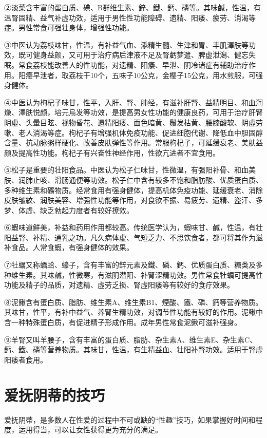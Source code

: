 \documentclass[12pt,UTF8]{ctexbook}
\begin{document}
②淡菜含丰富的蛋白质、碘、B群维生素、鋅、鐵、鈣、磷等。其味鹹，性温，有温腎固精、益气补虚功效，适用于男性性功能障碍、遗精、阳痿、疲劳、消渴等症。男性常食可强壮身体，增强性功能。

③中医认为荔枝味甘，性温，有补益气血、添精生髓、生津和胃、丰肌澤肤等功效，既可健身益颜，又可用于治疗病后津液不足及腎虧梦遣、脾虚泄潟、健忘失眠。常食荔枝能改善人的性功能，对遗精、阳痿、早泄、阴冷诸症有辅助治疗作用。阳痿早泄者，取荔枝干10个，五味子10公克，金樱子15公克，用水煎服，可强身健体。

④中医认为枸杞子味甘，性平，入肝、腎、肺经，有滋补肝腎、益精明目、和血润燥、澤肤悦颜，培元烏发等功效，是提高男女性功能的健康良药，可用于治疗肝腎阴虛、头暈目眩、视物昏花、遗精阳痿、面色暗黄、鬚发枯黄、腰膝酸软、阴虛劳嗽、老人消渴等症。枸杞子有增强机体免疫功能、促进细胞代谢、降低血中胆固醇含量、抗动脉粥样硬化、改善皮肤弹性等作用。常服枸杞子，可延缓衰老、美肤益颜及提高性功能。枸杞子有兴奋性神经作用，性欲亢进者不宜食用。

⑤松子是重要的壮阳食品。中医认为松子仁味甘，性微温，有强阳补骨、和血美肤、润肺止咳、滑肠通便等功效。松子仁中含有较多不饱和脂肪酸、优质蛋白质、多种维生素和礦物质。经常食用有强身健体，提高机体免疫功能、延缓衰老、消除皮肤皱紋、润肤美容、增强性功能等作用，对食欲不振、易疲劳、遗精、盗汗、多梦、体虚、缺乏勃起力度者有较好撩效。

⑥蝦味道鮮美，补益和药用作用都较高。传统医学认为，蝦味甘、鹹，性温，有壮阳益腎、补精、通乳之功。凡久病体虚、气短乏力、不思饮食者，都可将其作为滋补食品。人常食蝦，有强身健体的效果。

⑦牡蠣又称蠣蛤、蠔子，含有丰富的鋅元素及鐵、磷、鈣、优质蛋白质、糖类及多种维生素。其味鹹，性微寒，有滋阴潜阳、补腎涩精功效。男性常食牡蠣可提高性功能及精子的品质，对遗精、虛劳乏损、腎虛阳痿等有较好的食疗效果。

⑧泥鳅含有蛋白质、脂肪、维生素A、维生素B1、煙酸、鐵、磷、鈣等营养物质。其味甘，性平，有补中益气、养腎生精功效，对调节性功能有较好的作用。泥鳅中含一种特殊蛋白质，有促进精子形成作用。成年男性常食泥鳅可滋补强身。

⑨羊腎又叫羊腰子，含有丰富的蛋白质、脂肪、杂生素A、维生素E、杂生素C、鈣、鐵、磷等营养物质。其味甘，性温，有生精益血、壮阳补腎功效。适用于腎虚阳痿者食用。

\section{爱抚阴蒂的技巧}

爱抚阴蒂，是多数人在性爱的过程中不可或缺的“性趣”技巧，如果掌握好时间和程度，运用得当，可以让女性获得更为充分的满足。
\end{document}
